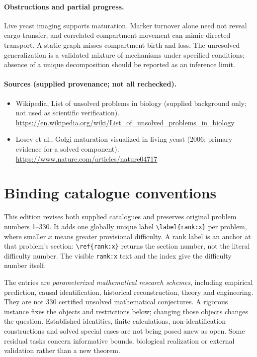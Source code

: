 \documentclass[11pt]{article}
\begin{document}
\paragraph{Obstructions and partial progress.} Live yeast imaging supports maturation. Marker turnover alone need not reveal cargo transfer, and correlated compartment movement can mimic directed transport. A static graph misses compartment birth and loss. The unresolved generalization is a validated mixture of mechanisms under specified conditions; absence of a unique decomposition should be reported as an inference limit.
\paragraph{Sources (supplied provenance; not all rechecked).}
\begin{itemize}
\item Wikipedia, List of unsolved problems in biology (supplied background only; not used as scientific verification). \url{https://en.wikipedia.org/wiki/List_of_unsolved_problems_in_biology}
\item Losev et al., Golgi maturation visualized in living yeast (2006; primary evidence for a solved component). \url{https://www.nature.com/articles/nature04717}
\end{itemize}


\section*{Binding catalogue conventions}
This edition revises both supplied catalogues and preserves original problem numbers 1--330. It adds one globally unique label \verb|\label{rank:x}| per problem, where smaller $x$ means greater provisional difficulty. A rank label is an anchor at that problem's section: \verb|\ref{rank:x}| returns the section number, not the literal difficulty number. The visible \texttt{rank:x} text and the index give the difficulty number itself.

The entries are \emph{parameterized mathematical research schemes}, including empirical prediction, causal identification, historical reconstruction, theory and engineering. They are not 330 certified unsolved mathematical conjectures. A rigorous instance fixes the objects and restrictions below; changing those objects changes the question. Established identities, finite calculations, non-identification constructions and solved special cases are not being posed anew as open. Some residual tasks concern informative bounds, biological realization or external validation rather than a new theorem.
\end{document}
